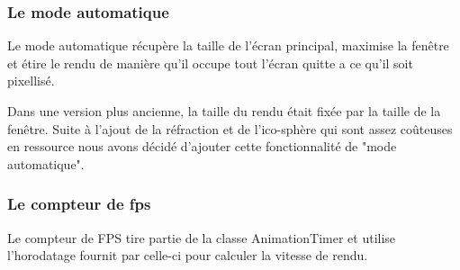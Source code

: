 \subsubsection{Le mode automatique}

Le mode automatique récupère la taille de l'écran principal, maximise la fenêtre et étire le rendu de manière qu'il occupe tout l'écran quitte a ce qu'il soit pixellisé.

Dans une version plus ancienne, la taille du rendu était fixée par la taille de la fenêtre. Suite à l'ajout de la réfraction et de l'ico-sphère qui sont assez coûteuses en ressource nous avons décidé d'ajouter cette fonctionnalité de "mode automatique".

\subsubsection{Le compteur de fps}

Le compteur de FPS tire partie de la classe AnimationTimer et utilise l'horodatage fournit par celle-ci pour calculer la vitesse de rendu.
